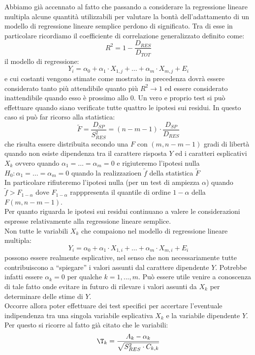 \documentclass[a4paper,12pt, oneside]{book}
\begin{document}
Abbiamo già accennato al fatto che passando a considerare la regressione lineare
multipla alcune quantità utilizzabili per valutare la bontà dell’adattamento di un
modello di regressione lineare semplice perdono di significato. Tra di esse in particolare
ricordiamo il coefficiente di correlazione generalizzato definito come:
\[R^{2}=1-\frac{D_{R E S}}{D_{T O T}}\]
il modello di regressione:
\[Y_{i}=\alpha_{0}+\alpha_{1} \cdot X_{1, j}+\ldots+\alpha_{m} \cdot X_{m, j}+E_{i}\]
e cui costanti vengono stimate come mostrato in precedenza dovrà essere
considerato tanto più attendibile quanto più $R^2\rightarrow 1$ ed essere considerato inattendibile quando esso è prossimo allo 0.
Un vero e proprio test si può effettuare quando siano verificate tutte quattro le ipotesi sui
residui. In questo caso si può far ricorso alla statistica:
\[\tilde{F}=\frac{D_{S P}}{S_{R E S}^{2}}=(n-m-1) \cdot \frac{D_{S P}}{D_{R E S}}\]
che risulta essere distribuita secondo una $F$ con $(m,n-m-1)$ gradi di libertà quando
non esiste dipendenza tra il carattere risposta $Y$ ed i caratteri esplicativi $X_k$ ovvero
quando $\alpha_{1}=\ldots=\alpha_{m}=0$ e rigiuteremo l'ipotesi nulla $H_{0} : \alpha_{1}=\ldots=\alpha_{m}=0$ quando la realizzazioen $\tilde{f}$ della statistica $\tilde{F}$\\
In particolare rifiuteremo l’ipotesi nulla (per un test di ampiezza $\alpha$) quando $\tilde{f}>F_{1-\alpha}$ dove $F_{1-\alpha}$ rapppresenta il quantile di ordine $1-\alpha $ della $F(m, n-m-1)$.\\
Per quanto riguarda le ipotesi sui residui continuano a valere le considerazioni
espresse relativamente alla regressione lineare semplice.\\
Non tutte le variabili $ X_k$ che compaiono nel modello di regressione lineare multipla:
\[Y_{i}=\alpha_{0}+\alpha_{1} \cdot X_{1, i}+\ldots+\alpha_{m} \cdot X_{m, i}+E_{i}\]
possono essere realmente esplicative, nel senso che non necessariamente tutte
contribuiscono a “spiegare” i valori assunti dal carattere dipendente $Y$.
Potrebbe infatti essere $\alpha_k=0$ per qualche $k=1,...,m$. Può essere utile venire a conoscenza di tale fatto onde evitare in futuro di rilevare i
valori assunti da $X_k$ per determinare delle stime di $Y$.\\
Occorre allora poter effettuare dei test specifici per accertare l’eventuale indipendenza
tra una singola variabile esplicativa $X_k$ e la variabile dipendente $Y$.
Per questo si ricorre al fatto già citato che le variabili:
\[\T_{k}=\frac{A_{k}-\alpha_{k}}{\sqrt{S_{R E S}^{2} \cdot C_{k, k}}}\]
\end{document}
